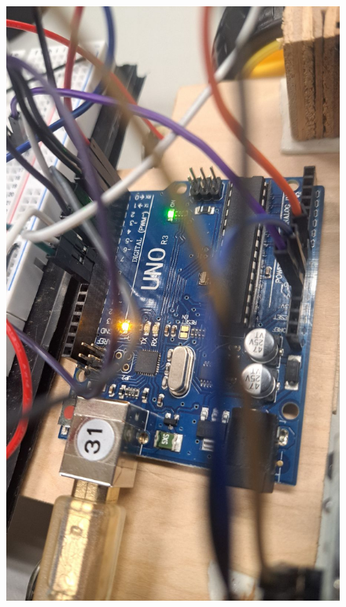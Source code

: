\documentclass[a4paper,12pt]{article}
\begin{document}
\begin{center}\begin{figure}[H]\centering
\hfill
\begin{minipage}[t]{0.45\textwidth}
\centering
\includegraphics[width=\textwidth]{./photos/g.jpg}
\end{minipage}
\hfill
\begin{minipage}[t]{0.45\textwidth}
\centering

\end{minipage}
\end{figure}
\end{center}
\end{document}
